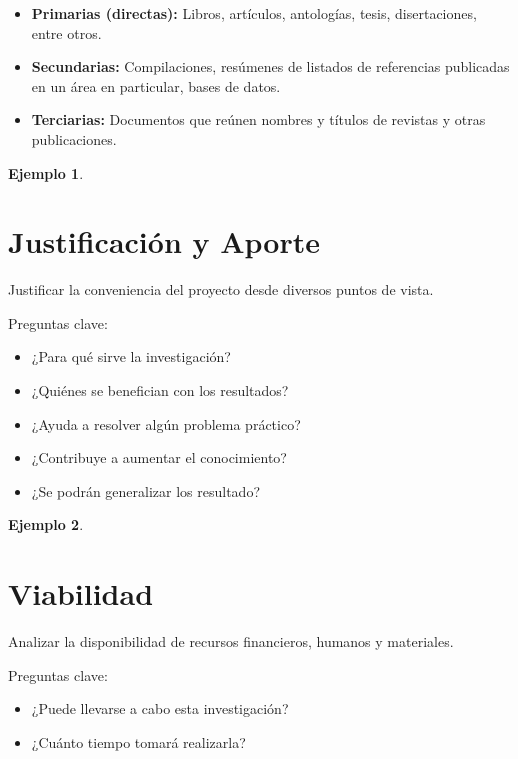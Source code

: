 \documentclass[letter,12pt]{report}
\newtheorem{ejemplo}{Ejemplo}
\newcommand\naranjo[1]{\textcolor[rgb]{1.00,0.36,0.06}{\textbf{#1}}}
\begin{document}
\begin{itemize}\justifying
  \item \naranjo{Primarias (directas):} Libros, artículos, antologías, tesis, disertaciones, entre otros.
  \item \naranjo{Secundarias:} Compilaciones, resúmenes de listados de referencias publicadas en un área en particular, bases de datos.
  \item \naranjo{Terciarias:} Documentos que reúnen nombres y títulos de revistas y otras publicaciones.
\end{itemize}



\begin{ejemplo}
\blindtext %
\end{ejemplo} 

\section{Justificación y Aporte}
Justificar la conveniencia del proyecto desde diversos puntos de vista.

Preguntas clave:
  \begin{itemize}
  \item ¿Para qué sirve la investigación?
  \item ¿Quiénes se benefician con los resultados?
  \item ¿Ayuda a resolver algún problema práctico?
  \item ¿Contribuye a aumentar el conocimiento?
  \item ¿Se podrán generalizar los resultado?
\end{itemize}



\begin{ejemplo}
\blindtext %
\end{ejemplo}


\section{Viabilidad}
Analizar la disponibilidad de recursos financieros, humanos y materiales.

Preguntas clave:
  \begin{itemize}\justifying
  \item ¿Puede llevarse a cabo esta investigación?
  \item ¿Cuánto tiempo tomará realizarla?
\end{itemize}
\end{document}
